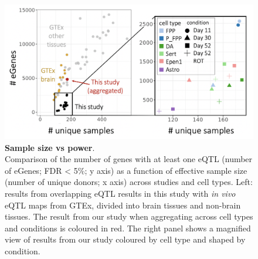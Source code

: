 \vspace{2mm}

\begin{figure}[h]
\includegraphics[width=15cm]{Chapter5/Fig/neuroseq_eqtl_gtex_scatterplot.png}
\caption[Sample size vs power]{\textbf{Sample size vs power}.\\
Comparison of the number of genes with at least one eQTL (number of eGenes; FDR < 5\%; y axis) as a function of effective sample size (number of unique donors; x axis) across studies and cell types. 
Left: results from overlapping eQTL results in this study with \textit{in vivo} eQTL maps from GTEx, divided into brain tissues and non-brain tissues. 
The result from our study when aggregating across cell types and conditions is coloured in red. 
The right panel shows a magnified view of results from our study coloured by cell type and shaped by condition.}
\label{fig:neuroseq_and_gtex_power}
\end{figure}

\newpage


